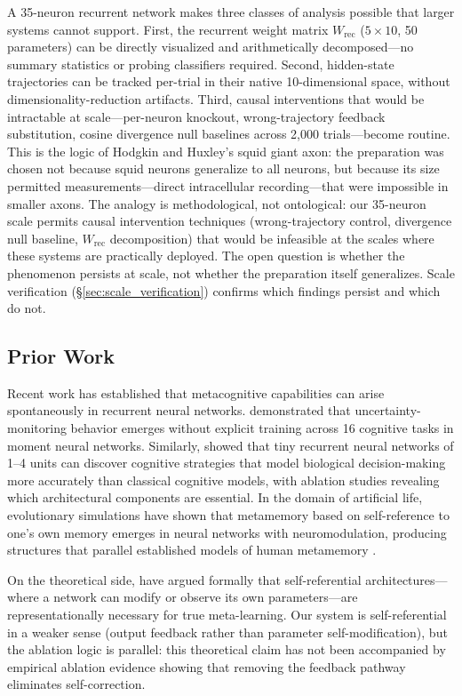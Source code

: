 \documentclass[10pt]{article}
\begin{document}
A 35-neuron recurrent network makes three classes of analysis possible that larger systems cannot support. First, the recurrent weight matrix $W_\text{rec}$ ($5 \times 10$, 50 parameters) can be directly visualized and arithmetically decomposed---no summary statistics or probing classifiers required. Second, hidden-state trajectories can be tracked per-trial in their native 10-dimensional space, without dimensionality-reduction artifacts. Third, causal interventions that would be intractable at scale---per-neuron knockout, wrong-trajectory feedback substitution, cosine divergence null baselines across 2,000 trials---become routine. This is the logic of Hodgkin and Huxley's squid giant axon: the preparation was chosen not because squid neurons generalize to all neurons, but because its size permitted measurements---direct intracellular recording---that were impossible in smaller axons. The analogy is methodological, not ontological: our 35-neuron scale permits causal intervention techniques (wrong-trajectory control, divergence null baseline, $W_\text{rec}$ decomposition) that would be infeasible at the scales where these systems are practically deployed. The open question is whether the phenomenon persists at scale, not whether the preparation itself generalizes. Scale verification (\S\ref{sec:scale_verification}) confirms which findings persist and which do not.

\subsection{Prior Work}

Recent work has established that metacognitive capabilities can arise spontaneously in recurrent neural networks. \citet{ma2025spontaneous} demonstrated that uncertainty-monitoring behavior emerges without explicit training across 16 cognitive tasks in moment neural networks. Similarly, \citet{li2025discovering} showed that tiny recurrent neural networks of 1--4 units can discover cognitive strategies that model biological decision-making more accurately than classical cognitive models, with ablation studies revealing which architectural components are essential. In the domain of artificial life, evolutionary simulations have shown that metamemory based on self-reference to one's own memory emerges in neural networks with neuromodulation, producing structures that parallel established models of human metamemory \citep{yamato2022evolution}.

On the theoretical side, \citet{kirsch2022eliminating} have argued formally that self-referential architectures---where a network can modify or observe its own parameters---are representationally necessary for true meta-learning. Our system is self-referential in a weaker sense (output feedback rather than parameter self-modification), but the ablation logic is parallel: this theoretical claim has not been accompanied by empirical ablation evidence showing that removing the feedback pathway eliminates self-correction.
\end{document}
